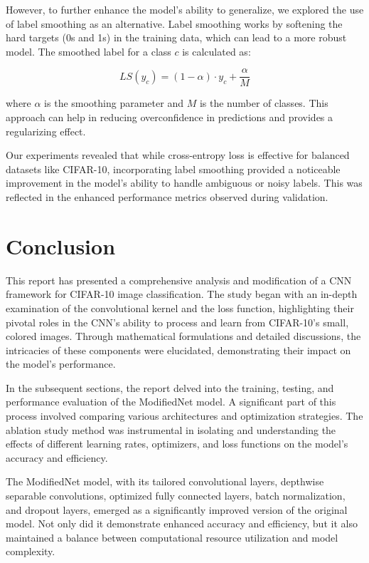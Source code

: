 \documentclass[conference]{IEEEtran}
\begin{document}
\begin{enumerate}
		However, to further enhance the model's ability to generalize, we explored the use of label smoothing as an alternative. Label smoothing works by softening the hard targets (0s and 1s) in the training data, which can lead to a more robust model. The smoothed label for a class \(c\) is calculated as:
		
		\begin{equation}
			LS(y_{c}) = (1 - \alpha) \cdot y_{c} + \frac{\alpha}{M}
		\end{equation}
		
		where \(\alpha\) is the smoothing parameter and \(M\) is the number of classes. This approach can help in reducing overconfidence in predictions and provides a regularizing effect.
		
		Our experiments revealed that while cross-entropy loss is effective for balanced datasets like CIFAR-10, incorporating label smoothing provided a noticeable improvement in the model's ability to handle ambiguous or noisy labels. This was reflected in the enhanced performance metrics observed during validation.
		
	\end{enumerate}
	
	\section{Conclusion}
	This report has presented a comprehensive analysis and modification of a CNN framework for CIFAR-10 image classification. The study began with an in-depth examination of the convolutional kernel and the loss function, highlighting their pivotal roles in the CNN's ability to process and learn from CIFAR-10's small, colored images. Through mathematical formulations and detailed discussions, the intricacies of these components were elucidated, demonstrating their impact on the model's performance.
	
	In the subsequent sections, the report delved into the training, testing, and performance evaluation of the ModifiedNet model. A significant part of this process involved comparing various architectures and optimization strategies. The ablation study method was instrumental in isolating and understanding the effects of different learning rates, optimizers, and loss functions on the model's accuracy and efficiency.
	
	The ModifiedNet model, with its tailored convolutional layers, depthwise separable convolutions, optimized fully connected layers, batch normalization, and dropout layers, emerged as a significantly improved version of the original model. Not only did it demonstrate enhanced accuracy and efficiency, but it also maintained a balance between computational resource utilization and model complexity.
	
\end{document}
